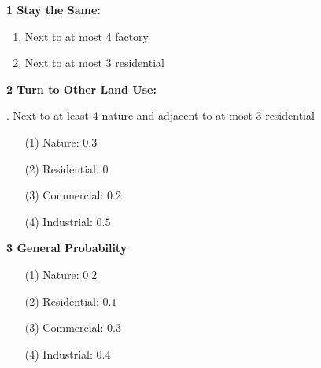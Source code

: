 \documentclass[a4paper,12pt]{report}
\begin{document}
\noindent
\textbf{1 Stay the Same: }

\begin{enumerate}
\item Next to at most 4 factory
\item Next to at most 3 residential
\end{enumerate}

\noindent
\textbf{2 Turn to Other Land Use:}

. Next to at least 4 nature and adjacent to at most 3 residential
\begin{enumerate}
\item[(1)] Nature: $0.3$ 
\item[(2)] Residential: $0$
\item[(3)] Commercial: $0.2$
\item[(4)] Industrial: $0.5$
\end{enumerate}

\noindent
\textbf{3 General Probability}
\begin{enumerate}
\item[(1)] Nature: $0.2$ 
\item[(2)] Residential: $0.1$
\item[(3)] Commercial: $0.3$
\item[(4)] Industrial: $0.4$
\end{enumerate}
\end{document}
